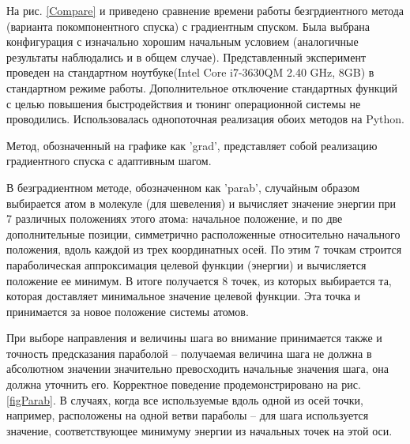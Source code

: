   На рис. \ref{Compare} и приведено сравнение времени работы безгрдиентного метода (варианта покомпонентного спуска) с градиентным спуском. Была выбрана конфигурация с изначально хорошим начальным условием (аналогичные результаты наблюдались и в общем случае). Представленный эксперимент проведен на стандартном ноутбуке(Intel Core i7-3630QM 2.40 GHz, 8GB) в стандартном режиме работы. Дополнительное отключение стандартных функций с целью повышения быстродействия и тюнинг операционной системы не проводились. Использовалась однопоточная реализация обоих методов на Python.

  Метод, обозначенный на графике как 'grad', представляет собой реализацию градиентного спуска с адаптивным шагом. 
  \iffalse
  При движении в направлении возрастания значения составляющей градиента мы уменьшаем величину шага, оставляя 0.8 от предыдущего значения. При уменьшении составляющей градиента -- возвращаемся к начальному значению.


  \begin{algorithm}
  \caption{Градиетный спуск}
  \SetKwFunction{FMain}{Вычисление шага}
  \SetKwProg{Fn}{Function}{:}{}
    \Fn{\FMain{}}{
    $ x^{k+1} = x^k - h * p^k;$ \tcp{$ p^k = \nabla f\left( x^k \right) $}   

    {\eIf{$ p^k \leq p^{k-1} $ \tcp{ Сравнение по каждой координате}}
    	{$ h = h - h * 0.2;$}
    	{$ h = startStep;$ \tcp{В эксперименте startStep = 0.015(const)}}
    }
  }
  \end{algorithm}

  \fi

  В безградиентном методе, обозначенном как 'parab', случайным образом выбирается атом в молекуле (для шевеления) и вычисляет значение энергии при 7 различных положениях этого атома: начальное положение, и по две дополнительные позиции, симметрично расположенные относительно начального положения, вдоль каждой из трех координатных осей. По этим 7 точкам строится параболическая аппроксимация целевой функции (энергии) и вычисляется положение ее минимум. В итоге получается 8 точек, из которых выбирается та, которая доставляет минимальное значение целевой функции. Эта точка и принимается за новое положение системы атомов. 
  \iffalse
  По каждой из осей проводится экстраполяция параболой в зависимости от минимума которой и определяется возможная длина шага вдоль данной оси. После из полученных минимумов выбирается наименьший по значению энергии, который и используется для смещения выбранного атома. Иллюстрация одной итерации подобного подхода изображена на рис. \ref{figParab}. 
  \fi
  \iffalse
  При выборе направления и величины шага во внимание принимается также и точность предсказания параболой -- получаемая величина шага не должна в абсолютном значении значительно превосходить начальные значения шага, она должна уточнить его. Корректное поведение продемонстрировано на 
  рис. \ref{figParab}. 
  В случаях, когда все используемые вдоль одной из осей точки, например, расположены на одной ветви параболы -- для шага используется значение, соответствующее минимуму энергии из начальных точек на этой оси.


